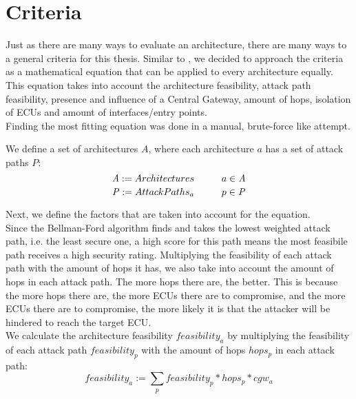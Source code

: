 \chapter{Criteria}
\label{chp:criteria}

Just as there are many ways to evaluate an architecture, there are many ways to a general criteria for this thesis.
Similar to \cite{threat_surf}, we decided to approach the criteria as a mathematical equation that can be applied to every architecture equally.
This equation takes into account the architecture feasibility, attack path feasibility, presence and influence of a Central Gateway,
amount of hops, isolation of ECUs and amount of interfaces/entry points.\\

Finding the most fitting equation was done in a manual, brute-force like attempt.\\\par

We define a set of architectures $\mathit{A}$, where each architecture $a$ has a set of attack paths $\mathit{P}$:\\
\begin{equation}
    \mathit{A} := {Architectures} \hspace*{1cm} a \in \mathit{A} \label{eq:architectures}
\end{equation}
\begin{equation}
    \mathit{P} := {Attack Paths_{a}} \hspace*{1cm} p \in \mathit{P} \label{eq:attack_paths}
\end{equation}

\hfill \break

Next, we define the factors that are taken into account for the equation.\\

Since the Bellman-Ford algorithm finds and takes the lowest weighted attack path, i.e. the least secure one, 
a high score for this path means the most feasibile path receives a high security rating.
Multiplying the feasibility of each attack path with the amount of hops it has, we also take into account the amount of hops in each attack path.
The more hops there are, the better.
This is because the more hops there are, the more ECUs there are to compromise, 
and the more ECUs there are to compromise, the more likely it is that the attacker will be hindered to reach the target ECU.\\
We calculate the architecture feasibility $feasibility_{a}$ by multiplying the feasibility of each attack path $feasibility_{p}$ with the amount of hops $hops_{p}$ in each attack path:
\begin{equation}
    feasibility_{a} := \sum_{p} feasibility_{p} * hops_{p} * cgw_{a} \label{eq:feasibility}
\end{equation}

